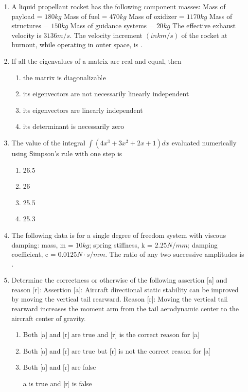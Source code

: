 \documentclass{article}
\begin{document}
\begin{enumerate}
\item A liquid propellant rocket has the following component masses:
Mass of payload = $180 kg$
Mass of fuel = $470 kg$
Mass of oxidizer = $1170 kg$
Mass of structures = $150 kg$
Mass of guidance systems = $20 kg$
The effective exhaust velocity is $3136 m/s$. The velocity increment $(in km/s)$ of the rocket at burnout, while operating in outer space, is \underline{\hspace{2cm}}.


\item If all the eigenvalues of a matrix are real and equal, then

\begin{enumerate}
\item the matrix is diagonalizable
\item its eigenvectors are not necessarily linearly independent
\item its eigenvectors are linearly independent
\item its determinant is necessarily zero
\end{enumerate}

\item The value of the integral $\int(4x^3 + 3x^2 + 2x + 1) dx$ evaluated numerically using Simpson's rule with one step is

\begin{multicols}{4}
\begin{enumerate}
\item 26.5
\item 26
\item 25.5
\item 25.3
\end{enumerate}
\end{multicols}

\item The following data is for a single degree of freedom system with viscous damping:
mass, m = $10 kg$; spring stiffness, k = $2.25 N/mm$;
damping coefficient, c = $0.0125 N·s/mm$.
The ratio of any two successive amplitudes is \underline{\hspace{2cm}}.


\item Determine the correctness or otherwise of the following assertion [a] and reason [r]:
Assertion [a]: Aircraft directional static stability can be improved by moving the vertical tail rearward.
Reason [r]: Moving the vertical tail rearward increases the moment arm from the tail aerodynamic center to the aircraft center of gravity.
\begin{enumerate}
\item Both [a] and [r] are true and [r] is the correct reason for [a]
\item Both [a] and [r] are true but [r] is not the correct reason for [a]
\item Both [a] and [r] are false
\item [a] is true and [r] is false
\end{enumerate}


\end{enumerate}
\end{document}
